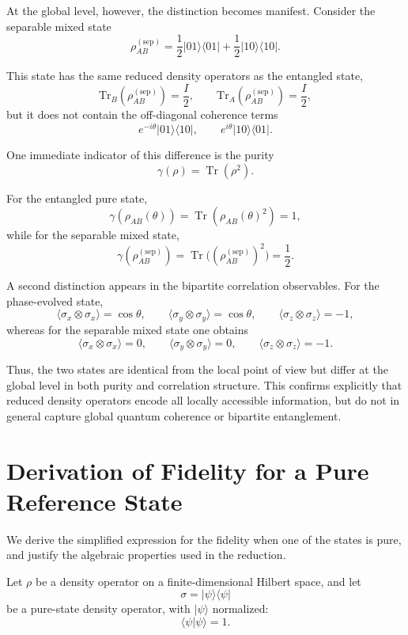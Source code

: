 \documentclass[a4paper]{article}
\begin{document}
\medskip

At the global level, however, the distinction becomes manifest. Consider the separable mixed state
\[
\rho_{AB}^{(\mathrm{sep})}
=
\frac{1}{2}|01\rangle\langle 01|
+
\frac{1}{2}|10\rangle\langle 10|.
\]

This state has the same reduced density operators as the entangled state,
\[
\mathrm{Tr}_B(\rho_{AB}^{(\mathrm{sep})}) = \frac{I}{2},
\qquad
\mathrm{Tr}_A(\rho_{AB}^{(\mathrm{sep})}) = \frac{I}{2},
\]
but it does not contain the off-diagonal coherence terms
\[
e^{-i\theta}|01\rangle\langle 10|,
\qquad
e^{i\theta}|10\rangle\langle 01|.
\]

One immediate indicator of this difference is the purity
\[
\gamma(\rho) = \operatorname{Tr}(\rho^2).
\]

For the entangled pure state,
\[
\gamma(\rho_{AB}(\theta)) = \operatorname{Tr}(\rho_{AB}(\theta)^2) = 1,
\]
while for the separable mixed state,
\[
\gamma(\rho_{AB}^{(\mathrm{sep})}) = \operatorname{Tr}\big((\rho_{AB}^{(\mathrm{sep})})^2\big) = \frac{1}{2}.
\]

A second distinction appears in the bipartite correlation observables. For the phase-evolved state,
\[
\langle \sigma_x \otimes \sigma_x \rangle = \cos\theta, \qquad
\langle \sigma_y \otimes \sigma_y \rangle = \cos\theta, \qquad
\langle \sigma_z \otimes \sigma_z \rangle = -1,
\]
whereas for the separable mixed state one obtains
\[
\langle \sigma_x \otimes \sigma_x \rangle = 0, \qquad
\langle \sigma_y \otimes \sigma_y \rangle = 0, \qquad
\langle \sigma_z \otimes \sigma_z \rangle = -1.
\]

Thus, the two states are identical from the local point of view but differ at the global level in both purity and correlation structure. This confirms explicitly that reduced density operators encode all locally accessible information, but do not in general capture global quantum coherence or bipartite entanglement.
\section{Derivation of Fidelity for a Pure Reference State}

We derive the simplified expression for the fidelity when one of the states is pure, and justify the algebraic properties used in the reduction.

\medskip

Let $\rho$ be a density operator on a finite-dimensional Hilbert space, and let
\[
\sigma = |\psi\rangle\langle\psi|
\]
be a pure-state density operator, with $|\psi\rangle$ normalized:
\[
\langle \psi | \psi \rangle = 1.
\]
\end{document}
